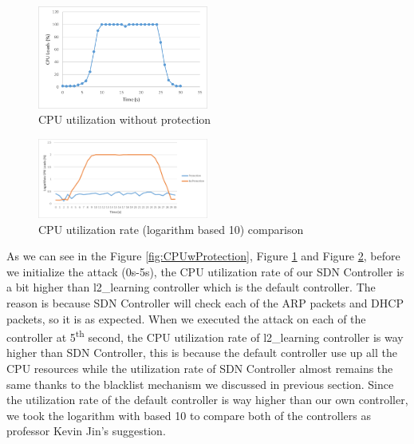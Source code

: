 \documentclass[conference]{IEEEtran}
\begin{document}
\begin{figure}[h!]
\includegraphics[width=0.5\textwidth]{CPUwoProtection.png}
\caption{CPU utilization without protection}
\label{fig:CPUwoProtection}
\end{figure}

\begin{figure}[h!]
\includegraphics[width=0.5\textwidth]{CPUCompareLog.png}
\caption{CPU utilization rate (logarithm based 10) comparison}
\label{fig:CPUComparison}
\end{figure}

As we can see in the Figure \ref{fig:CPUwProtection}, Figure \ref{fig:CPUwoProtection} and Figure \ref{fig:CPUComparison}, before we initialize the attack (0s-5s), the CPU utilization rate of our SDN Controller is a bit higher than l2\_learning controller which is the default controller. The reason is because SDN Controller will check each of the ARP packets and DHCP packets, so it is as expected. When we executed the attack on each of the controller at 5\textsuperscript{th} second, the CPU utilization rate of l2\_learning controller is way higher than SDN Controller, this is because the default controller use up all the CPU resources while the utilization rate of SDN Controller almost remains the same thanks to the blacklist mechanism we discussed in previous section. Since the utilization rate of the default controller is way higher than our own controller, we took the logarithm with based 10 to compare both of the controllers as professor Kevin Jin's suggestion.
\end{document}
